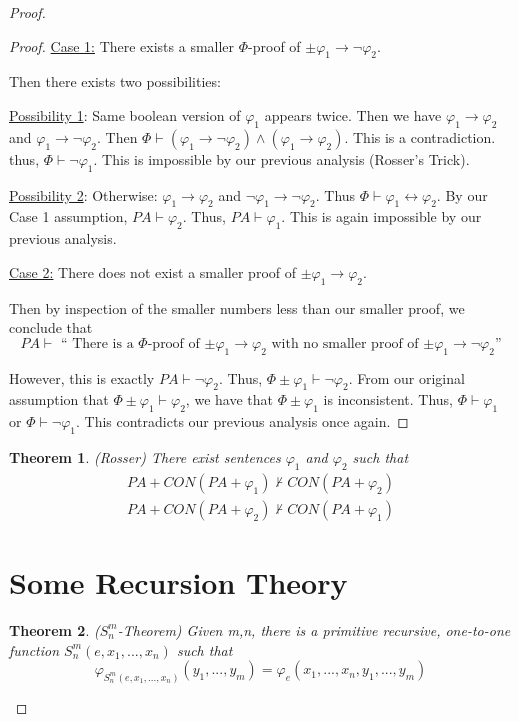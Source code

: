 \documentclass[a4paper,10pt]{article}
\newtheorem{theorem}{Theorem}[section]
\let\phi\varphi
\newcommand*\map{\rightarrow}
\newcommand*\n{\newline\par}
\newcommand*\prf{\vdash}
\newcommand*\biject{\leftrightarrow}
\begin{document}
\begin{proof}
\begin{proof}
    \underline{Case 1:} There exists a smaller $\Phi$-proof of $\pm\phi_1\map\neg\phi_2$. \n
    
    Then there exists two possibilities: \n 
    
    \underline{Possibility 1}: Same boolean version of $\phi_1$ appears twice.
    Then we have $\phi_1\map\phi_2$ and $\phi_1\map\neg\phi_2$. Then $\Phi \prf (\phi_1\map\neg\phi_2) \land (\phi_1\map\phi_2)$. This is a contradiction. thus, $\Phi \prf \neg\phi_1$. This is impossible by our previous analysis (Rosser's Trick). \n
    
    \underline{Possibility 2}: Otherwise: $\phi_1\map\phi_2$ and $\neg\phi_1\map\neg\phi_2$. Thus $\Phi \prf \phi_1 \biject \phi_2$. By our Case 1 assumption, $PA \prf \phi_2$. Thus, $PA \prf \phi_1$. This is again impossible by our previous analysis. \n
    
    \underline{Case 2:} There does not exist a smaller proof of $\pm\phi_1\map\phi_2$.
    
    Then by inspection of the smaller numbers less than our smaller proof, we conclude that 
    \begin{equation*}
     PA \prf \text{ `` There is a $\Phi$-proof of $\pm\phi_1 \map \phi_2$ with no smaller proof of $\pm\phi_1 \map \neg\phi_2$''}
    \end{equation*}

    However, this is exactly $PA \prf \neg\phi_2$. Thus, $\Phi \pm \phi_1 \prf \neg\phi_2$. From our original assumption that $\Phi\pm\phi_1\prf\phi_2$, we have that $\Phi \pm \phi_1$ is inconsistent. Thus, $\Phi \prf \phi_1$ or $\Phi \prf \neg\phi_1$.
    This contradicts our previous analysis once again.
  \end{proof}

  \begin{theorem}
   (Rosser)
   There exist sentences $\phi_1$ and $\phi_2$ such that 
   \begin{gather*}
    PA + CON(PA + \phi_1) \not\prf CON(PA + \phi_2) \\ 
    PA + CON(PA + \phi_2) \not\prf CON(PA + \phi_1)
   \end{gather*}
  \end{theorem}

   \newpage
   \section{Some Recursion Theory}
   
   \begin{theorem}
   ($S_n^m$-Theorem)
    Given m,n, there is a primitive recursive, one-to-one function $S_n^m(e,x_1,...,x_n)$ such that
    \begin{equation*}
      \phi_{S_n^m(e,x_1,...,x_n)}(y_1,...,y_m) = \phi_e(x_1,...,x_n,y_1,...,y_m)
    \end{equation*}
   \end{theorem}


\end{proof}
\end{document}
